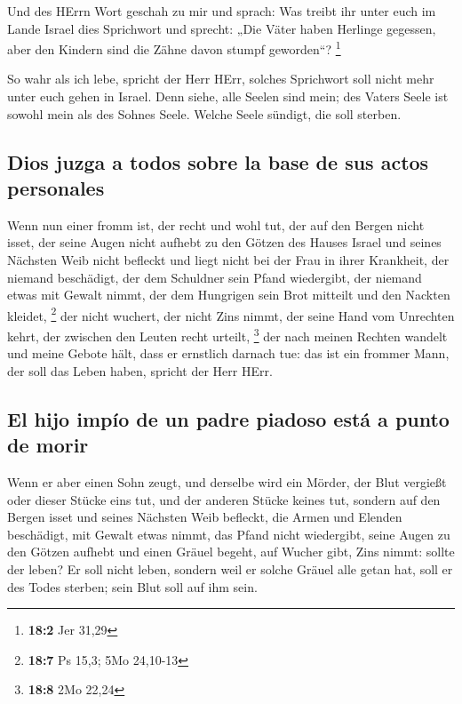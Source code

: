  Und des HErrn Wort geschah zu mir und sprach:
 Was treibt ihr unter euch im Lande Israel dies Sprichwort
und sprecht: „Die Väter haben Herlinge gegessen, aber den Kindern sind
die Zähne davon stumpf geworden``? \footnote{\textbf{18:2} Jer 31,29}

 So wahr als ich lebe, spricht der Herr HErr, solches
Sprichwort soll nicht mehr unter euch gehen in Israel. 
Denn siehe, alle Seelen sind mein; des Vaters Seele ist sowohl mein als
des Sohnes Seele. Welche Seele sündigt, die soll sterben.

\hypertarget{dios-juzga-a-todos-sobre-la-base-de-sus-actos-personales}{%
\subsection{Dios juzga a todos sobre la base de sus actos
personales}\label{dios-juzga-a-todos-sobre-la-base-de-sus-actos-personales}}

 Wenn nun einer fromm ist, der recht und wohl tut,
 der auf den Bergen nicht isset, der seine Augen nicht
aufhebt zu den Götzen des Hauses Israel und seines Nächsten Weib nicht
befleckt und liegt nicht bei der Frau in ihrer Krankheit, 
der niemand beschädigt, der dem Schuldner sein Pfand wiedergibt, der
niemand etwas mit Gewalt nimmt, der dem Hungrigen sein Brot mitteilt und
den Nackten kleidet, \footnote{\textbf{18:7} Ps 15,3; 5Mo 24,10-13}
 der nicht wuchert, der nicht Zins nimmt, der seine Hand
vom Unrechten kehrt, der zwischen den Leuten recht urteilt, \footnote{\textbf{18:8}
  2Mo 22,24}  der nach meinen Rechten wandelt und meine
Gebote hält, dass er ernstlich darnach tue: das ist ein frommer Mann,
der soll das Leben haben, spricht der Herr HErr.

\hypertarget{el-hijo-impuxedo-de-un-padre-piadoso-estuxe1-a-punto-de-morir}{%
\subsection{El hijo impío de un padre piadoso está a punto de
morir}\label{el-hijo-impuxedo-de-un-padre-piadoso-estuxe1-a-punto-de-morir}}

 Wenn er aber einen Sohn zeugt, und derselbe wird ein
Mörder, der Blut vergießt oder dieser Stücke eins tut, 
und der anderen Stücke keines tut, sondern auf den Bergen isset und
seines Nächsten Weib befleckt,  die Armen und Elenden
beschädigt, mit Gewalt etwas nimmt, das Pfand nicht wiedergibt, seine
Augen zu den Götzen aufhebt und einen Gräuel begeht,  auf
Wucher gibt, Zins nimmt: sollte der leben? Er soll nicht leben, sondern
weil er solche Gräuel alle getan hat, soll er des Todes sterben; sein
Blut soll auf ihm sein.

